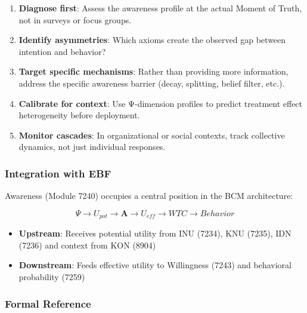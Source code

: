 \begin{enumerate}
    \item \textbf{Diagnose first}: Assess the awareness profile at the 
          actual Moment of Truth, not in surveys or focus groups.
    
    \item \textbf{Identify asymmetries}: Which axioms create the observed 
          gap between intention and behavior?
    
    \item \textbf{Target specific mechanisms}: Rather than providing more 
          information, address the specific awareness barrier (decay, 
          splitting, belief filter, etc.).
    
    \item \textbf{Calibrate for context}: Use Ψ-dimension profiles to 
          predict treatment effect heterogeneity before deployment.
    
    \item \textbf{Monitor cascades}: In organizational or social contexts, 
          track collective dynamics, not just individual responses.
\end{enumerate}

\subsubsection{Integration with EBF}

Awareness (Module 7240) occupies a central position in the BCM architecture:

\begin{equation}
\Psi \rightarrow U_{pot} \rightarrow \boxed{\mathbf{A}} \rightarrow U_{eff} \rightarrow WTC \rightarrow Behavior
\end{equation}

\begin{itemize}
    \item \textbf{Upstream}: Receives potential utility from INU (7234), 
          KNU (7235), IDN (7236) and context from KON (8904)
    \item \textbf{Downstream}: Feeds effective utility to Willingness (7243) 
          and behavioral probability (7259)
\end{itemize}

\subsubsection{Formal Reference}

